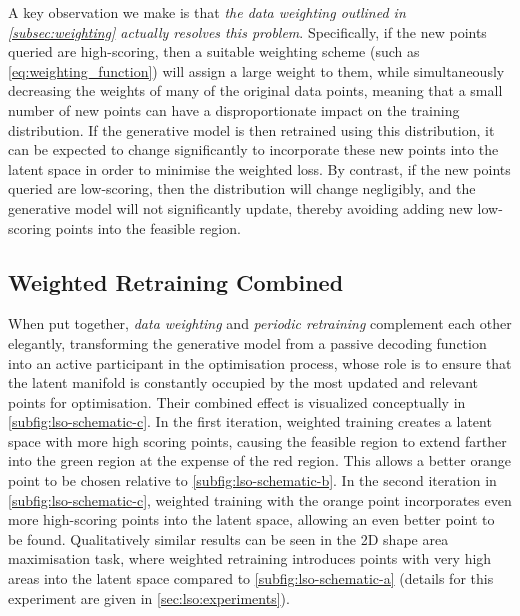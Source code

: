 A key observation we make is that \emph{the data weighting outlined in \cref{subsec:weighting} actually resolves this problem}.
Specifically, if the new points queried are high-scoring,
then a suitable weighting scheme (such as \cref{eq:weighting_function}) will assign a large weight to them,
while simultaneously decreasing the weights of many of the original data points,
meaning that a small number of new points can have a disproportionate impact on the training distribution.
If the generative model is then retrained using this distribution,
it can be expected to change significantly to incorporate these new points into the latent space in order to minimise the weighted loss.
By contrast, if the new points queried are low-scoring,
then the distribution will change negligibly, and the generative model will not significantly update, thereby avoiding adding new low-scoring points into the feasible region.
\subsection{Weighted Retraining Combined}
\label{subsec:weighted-retraining}
When put together, \emph{data weighting} and \emph{periodic retraining} complement each other elegantly,
transforming the generative model from a passive decoding function into an active participant
in the optimisation process,
whose role is to ensure that the latent manifold is constantly
occupied by the most updated and relevant points for optimisation.
Their combined effect is visualized conceptually in \cref{subfig:lso-schematic-c}.
In the first iteration, weighted training creates a latent space with more high scoring points,
causing the feasible region to extend farther into the green region at the expense of the red region.
This allows a better orange point to be chosen relative to \cref{subfig:lso-schematic-b}.
In the second iteration in \cref{subfig:lso-schematic-c},
weighted training with the orange point 
incorporates even more high-scoring points into the latent space,
allowing an even better point to be found.
Qualitatively similar results can be seen in the 2D shape area maximisation task,
where weighted retraining introduces points with very high areas
into the latent space compared to \cref{subfig:lso-schematic-a}
(details for this experiment are given in \cref{sec:lso:experiments}).

